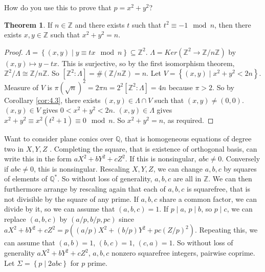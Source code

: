\documentclass{article}
\newcommand{\Z}{\mathbb{Z}}
\newcommand{\Q}{\mathbb{Q}}
\newcommand{\rb}[1]{\left( #1 \right)}
\renewcommand{\sb}[1]{\left[ #1 \right]}
\newcommand{\cb}[1]{\left\{ #1 \right\}}
\theoremstyle{definition}\newtheorem{definition}{Definition}[section]
\theoremstyle{definition}\newtheorem{remark}[definition]{Remark}
\theoremstyle{definition}\newtheorem*{example}{Example}
\theoremstyle{definition}\newtheorem*{note}{Note}
\newtheorem{theorem}[definition]{Theorem}
\begin{document}
How do you use this to prove that $ p = x^2 + y^2 $?


\begin{theorem}
If $ n \in \Z $ and there exists $ t $ such that $ t^2 \equiv -1 \mod n $, then there exists $ x, y \in \Z $ such that $ x^2 + y^2 = n $.
\end{theorem}

\begin{proof}
$ \Lambda = \cb{\rb{x, y} \mid y \equiv tx \mod n} \subseteq \Z^2 $. $ \Lambda = Ker\rb{\Z^2 \to \Z / n\Z} $ by $ \rb{x, y} \mapsto y - tx $. This is surjective, so by the first isomorphism theorem, $ \Z^2 / \Lambda \cong \Z / n\Z $. So $ \sb{\Z^2 : \Lambda} = \#\rb{\Z / n\Z} = n $. Let $ V = \cb{\rb{x, y} \mid x^2 + y^2 < 2n} $. Measure of $ V $ is $ \pi\rb{\sqrt{n}}^2 = 2\pi n = 2^2\sb{\Z^2 : \Lambda} = 4n $ because $ \pi > 2 $. So by Corollary \ref{cor:4.3}, there exists $ \rb{x, y} \in \Lambda \cap V $ such that $ \rb{x, y} \ne \rb{0, 0} $. $ \rb{x, y} \in V $ gives $ 0 < x^2 + y^2 < 2n $. $ \rb{x, y} \in \Lambda $ gives $ x^2 + y^2 \equiv x^2\rb{t^2 + 1} \equiv 0 \mod n $. So $ x^2 + y^2 = n $, as required.
\end{proof}

Want to consider plane conics over $ \Q $, that is homogeneous equations of degree two in $ X, Y, Z $ . Completing the square, that is existence of orthogonal basis, can write this in the form $ aX^2 + bY^2 + cZ^2 $. If this is nonsingular, $ abc \ne 0 $. Conversely if $ abc \ne 0 $, this is nonsingular. Rescaling $ X, Y, Z $, we can change $ a, b, c $ by squares of elements of $ \Q^* $. So without loss of generality, $ a, b, c $ are all in $ \Z $. We can then furthermore arrange by rescaling again that each of $ a, b, c $ is squarefree, that is not divisible by the square of any prime. If $ a, b, c $ share a common factor, we can divide by it, so we can assume that $ \rb{a, b, c} = 1 $. If $ p \mid a $, $ p \mid b $, so $ p \mid c $, we can replace $ \rb{a, b, c} $ by $ \rb{a / p, b / p, pc} $ since $ aX^2 + bY^2 + cZ^2 = p\rb{\rb{a / p}X^2 + \rb{b / p}Y^2 + pc\rb{Z / p}^2} $. Repeating this, we can assume that $ \rb{a, b} = 1 $, $ \rb{b, c} = 1 $, $ \rb{c, a} = 1 $. So without loss of generality $ aX^2 + bY^2 + cZ^2 $, $ a, b, c $ nonzero squarefree integers, pairwise coprime. Let $ \Sigma = \cb{p \mid 2abc} $ for $ p $ prime.
\end{document}
